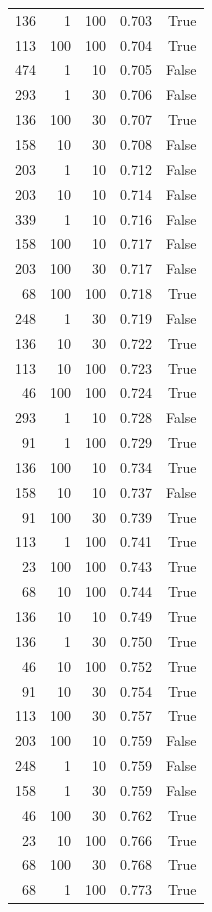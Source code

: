 \begin{tabular}{rrrrr}
136 & 1 & 100 & 0.703 & True \\
113 & 100 & 100 & 0.704 & True \\
474 & 1 & 10 & 0.705 & False \\
293 & 1 & 30 & 0.706 & False \\
136 & 100 & 30 & 0.707 & True \\
158 & 10 & 30 & 0.708 & False \\
203 & 1 & 10 & 0.712 & False \\
203 & 10 & 10 & 0.714 & False \\
339 & 1 & 10 & 0.716 & False \\
158 & 100 & 10 & 0.717 & False \\
203 & 100 & 30 & 0.717 & False \\
68 & 100 & 100 & 0.718 & True \\
248 & 1 & 30 & 0.719 & False \\
136 & 10 & 30 & 0.722 & True \\
113 & 10 & 100 & 0.723 & True \\
46 & 100 & 100 & 0.724 & True \\
293 & 1 & 10 & 0.728 & False \\
91 & 1 & 100 & 0.729 & True \\
136 & 100 & 10 & 0.734 & True \\
158 & 10 & 10 & 0.737 & False \\
91 & 100 & 30 & 0.739 & True \\
113 & 1 & 100 & 0.741 & True \\
23 & 100 & 100 & 0.743 & True \\
68 & 10 & 100 & 0.744 & True \\
136 & 10 & 10 & 0.749 & True \\
136 & 1 & 30 & 0.750 & True \\
46 & 10 & 100 & 0.752 & True \\
91 & 10 & 30 & 0.754 & True \\
113 & 100 & 30 & 0.757 & True \\
203 & 100 & 10 & 0.759 & False \\
248 & 1 & 10 & 0.759 & False \\
158 & 1 & 30 & 0.759 & False \\
46 & 100 & 30 & 0.762 & True \\
23 & 10 & 100 & 0.766 & True \\
68 & 100 & 30 & 0.768 & True \\
68 & 1 & 100 & 0.773 & True \\

\end{tabular}
